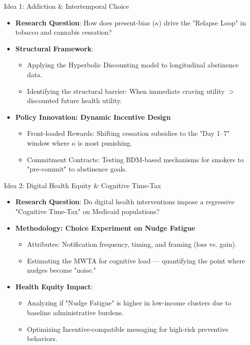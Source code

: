 \begin{frame}{Idea 1: Addiction \& Intertemporal Choice}
    \begin{itemize}
        \item \textbf{Research Question}: How does present-bias ($\kappa$) drive the "Relapse Loop" in tobacco and cannabis cessation?
        \item \textbf{Structural Framework}:
            \begin{itemize}
                \item Applying the \alert{Hyperbolic Discounting} model to longitudinal abstinence data.
                \item Identifying the structural barrier: When immediate craving utility $>$ discounted future health utility.
            \end{itemize}
        \item \textbf{Policy Innovation: Dynamic Incentive Design}
            \begin{itemize}
                \item \alert{Front-loaded Rewards}: Shifting cessation subsidies to the "Day 1--7" window where $\kappa$ is most punishing.
                \item \alert{Commitment Contracts}: Testing BDM-based mechanisms for smokers to "pre-commit" to abstinence goals.
            \end{itemize}
    \end{itemize}
\end{frame}

\begin{frame}{Idea 2: Digital Health Equity \& Cognitive Time-Tax}
    \begin{itemize}
        \item \textbf{Research Question}: Do digital health interventions impose a regressive \alert{"Cognitive Time-Tax"} on Medicaid populations?
        \item \textbf{Methodology: Choice Experiment on Nudge Fatigue}
            \begin{itemize}
                \item Attributes: Notification frequency, timing, and framing (loss vs. gain).
                \item Estimating the \alert{MWTA for cognitive load} --- quantifying the point where nudges become "noise."
            \end{itemize}
        \item \textbf{Health Equity Impact}:
            \begin{itemize}
                \item Analyzing if "Nudge Fatigue" is higher in low-income clusters due to baseline administrative burdens.
                \item Optimizing \alert{Incentive-compatible messaging} for high-risk preventive behaviors.
            \end{itemize}
    \end{itemize}
\end{frame}
